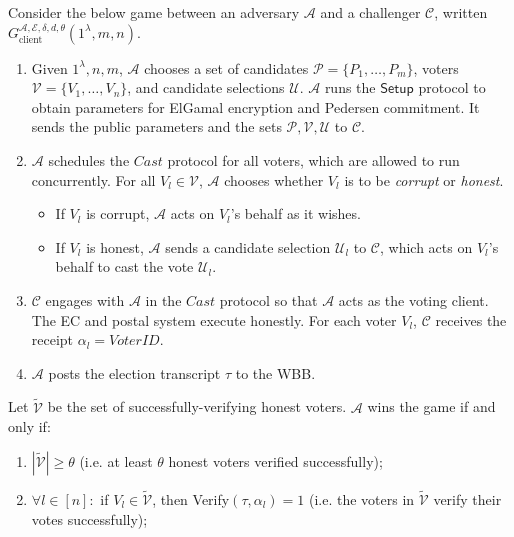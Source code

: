 \documentclass[12pt,a4paper]{article}
\theoremstyle{definition}
\newcommand{\VoterID}{\mathit{VoterID}}
\begin{document}
\begin{definition}
    Consider the below game between an adversary $\mathcal{A}$ and a challenger $\mathcal{C}$, written $G_\text{client}^{\mathcal{A},\mathcal{E},\delta,d,\theta}(1^\lambda, m, n)$.
    \begin{enumerate}
        \item Given $1^\lambda, n, m$, $\mathcal{A}$ chooses a set of candidates $\mathcal{P}=\{P_1,\ldots,P_m\}$, voters $\mathcal{V}=\{V_1,\ldots,V_n\}$, and candidate selections $\mathcal{U}$. $\mathcal{A}$ runs the $\mathsf{Setup}$ protocol to obtain parameters for ElGamal encryption and Pedersen commitment. It sends the public parameters and the sets $\mathcal{P}, \mathcal{V}, \mathcal{U}$ to $\mathcal{C}$.
        
        \item $\mathcal{A}$ schedules the $\mathit{Cast}$ protocol for all voters, which are allowed to run concurrently. For all $V_l\in\mathcal{V}$, $\mathcal{A}$ chooses whether $V_l$ is to be \textit{corrupt} or \textit{honest}.
        \begin{itemize}
            \item If $V_l$ is corrupt, $\mathcal{A}$ acts on $V_l$'s behalf as it wishes.
            \item If $V_l$ is honest, $\mathcal{A}$ sends a candidate selection $\mathcal{U}_l$ to $\mathcal{C}$, which acts on $V_l$'s behalf to cast the vote $\mathcal{U}_l$.
        \end{itemize}

        \item $\mathcal{C}$ engages with $\mathcal{A}$ in the $\mathit{Cast}$ protocol so that $\mathcal{A}$ acts as the voting client. The EC and postal system execute honestly. For each voter $V_l$, $\mathcal{C}$ receives the receipt $\alpha_l=\VoterID$.

        \item $\mathcal{A}$ posts the election transcript $\tau$ to the WBB.
    \end{enumerate}
    Let $\tilde{\mathcal{V}}$ be the set of successfully-verifying honest voters. $\mathcal{A}$ wins the game if and only if:
    \begin{enumerate}
        \item $|\tilde{\mathcal{V}}| \geq \theta$ (i.e. at least $\theta$ honest voters verified successfully);
        \item $\forall l \in [n]:$ if $V_l \in \tilde{\mathcal{V}}$, then Verify$(\tau, \alpha_l) 	=1$ (i.e. the voters in $\tilde{\mathcal{V}}$ verify their votes successfully);
    

\end{enumerate}
\end{definition}
\end{document}
